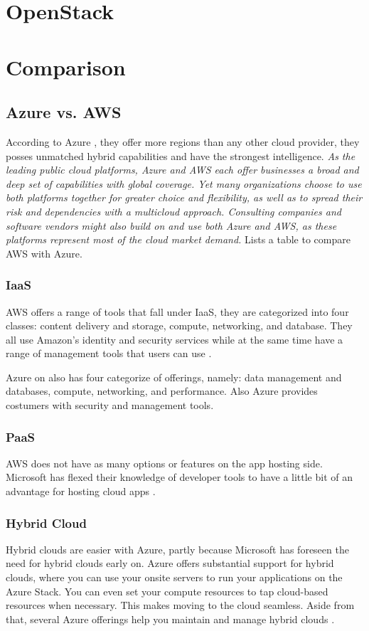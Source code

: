 \section{OpenStack}

\section{Comparison}

\subsection{Azure vs. AWS}
According to Azure \cite{Azure}, they offer more regions than any other cloud provider, they posses unmatched hybrid capabilities and have the strongest intelligence. 
\textit{As the leading public cloud platforms, Azure and AWS each offer businesses a broad and deep set of capabilities with global coverage. Yet many organizations choose to use both platforms together for greater choice and flexibility, as well as to spread their risk and dependencies with a multicloud approach. Consulting companies and software vendors might also build on and use both Azure and AWS, as these platforms represent most of the cloud market demand.} Lists a table to compare AWS with Azure.

\subsubsection{IaaS}
AWS offers a range of tools that fall under IaaS, they are categorized into four classes: content delivery and storage, compute, networking, and database. They all use Amazon's identity and security services while at the same time have a range of management tools that users can use \cite{stackify}. 

Azure on also has four categorize of offerings, namely: data management and databases, compute, networking, and performance. Also Azure provides costumers with security and management tools. 

\subsubsection{PaaS}
AWS does not have as many options or features on the app hosting side. Microsoft has flexed their knowledge of developer tools to have a little bit of an advantage for hosting cloud apps \cite{stackify}.

\subsubsection{Hybrid Cloud}
Hybrid clouds are easier with Azure, partly because Microsoft has foreseen the need for hybrid clouds early on.  Azure offers substantial support for hybrid clouds, where you can use your onsite servers to run your applications on the Azure Stack.  You can even set your compute resources to tap cloud-based resources when necessary. This makes moving to the cloud seamless.  Aside from that, several Azure offerings help you maintain and manage hybrid clouds \cite{stackify}.

